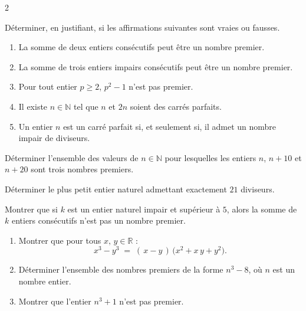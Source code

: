 \documentclass[a4paper,12pt]{article}
\begin{document}
\begin{multicols}{2}
\begin{exercice}[title=Exercice 6 $\star\star$ { [Raisonner] }]{}{}
  Déterminer, en justifiant, si les affirmations suivantes sont vraies ou fausses.
  \begin{enumerate}
    \item La somme de deux entiers consécutifs peut être un nombre premier.
    \item La somme de trois entiers impairs consécutifs peut être un nombre premier.
    \item Pour tout entier $p \ge 2$, $p^2 - 1$ n'est pas premier.
    \item Il existe $n \in \mathbb{N}$ tel que $n$ et $2n$ soient des carrés parfaits.
    \item Un entier $n$ est un carré parfait si, et seulement si, il admet un nombre impair de diviseurs.
  \end{enumerate}
\end{exercice}

\begin{exercice}[title=Exercice 7 $\star\star$ { [Calculer, Chercher] }]{}{}
  Déterminer l'ensemble des valeurs de \(n \in \mathbb{N}\) pour lesquelles les entiers \(n\), \(n+10\) et \(n+20\) sont trois nombres premiers.
\end{exercice}
\newpage
\begin{exercice}[title=Exercice 8 $\star\star$ { [Calculer] }]{}{}
  Déterminer le plus petit entier naturel admettant exactement \(21\) diviseurs.
\end{exercice}

\begin{exercice}[title=Exercice 9 $\star\star$ { [Raisonner, Communiquer] }]{}{}
  Montrer que si \(k\) est un entier naturel impair et supérieur à \(5\), alors la somme de \(k\) entiers consécutifs n'est pas un nombre premier.
\end{exercice}

\begin{exercice}[title=Exercice 10 $\star\star$ { [Calculer] }]{}{}
  \begin{enumerate}
    \item Montrer que pour tous \(x,\,y \in \mathbb{R}\) :
      \[
        x^3 - y^3 \;=\; (\,x - y\,)\,\bigl(x^2 + x\,y + y^2\bigr).
      \]
    \item Déterminer l'ensemble des nombres premiers de la forme \(n^3 - 8\), où \(n\) est un nombre entier.
    \item Montrer que l'entier \(n^3 + 1\) n'est pas premier.
  \end{enumerate}
\end{exercice}


\end{multicols}
\end{document}
